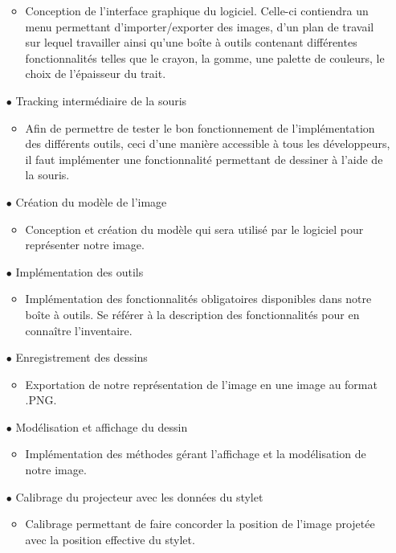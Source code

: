 \documentclass[11pt,a4paper,oldfontcommands]{memoir}
\begin{document}
\begin{itemize}
\begin{itemize}
	\item Conception de l’interface graphique du logiciel. Celle-ci contiendra un menu permettant d’importer/exporter des images, d’un plan de travail sur lequel travailler ainsi qu’une boîte à outils contenant différentes fonctionnalités telles que le crayon, la gomme, une palette de couleurs, le choix de l’épaisseur du trait.
	\end{itemize}
\item[$\bullet$] Tracking intermédiaire de la souris
    \begin{itemize}
	\item Afin de permettre de tester le bon fonctionnement de l’implémentation des différents outils, ceci d’une manière accessible à tous les développeurs, il faut implémenter une fonctionnalité permettant de dessiner à l’aide de la souris.
	\end{itemize}
\item[$\bullet$] Création du modèle de l’image
    \begin{itemize}
	\item Conception et création du modèle qui sera utilisé par le logiciel pour représenter notre image.
	\end{itemize}
\item[$\bullet$] Implémentation des outils
    \begin{itemize}
	\item Implémentation des fonctionnalités obligatoires disponibles dans notre boîte à outils. Se référer à la description des fonctionnalités pour en connaître l'inventaire.
	\end{itemize}
\item[$\bullet$] Enregistrement des dessins
    \begin{itemize}
	\item Exportation de notre représentation de l’image en une image au format .PNG.
	\end{itemize}
\item[$\bullet$] Modélisation et affichage du dessin
    \begin{itemize}
	\item Implémentation des méthodes gérant l’affichage et la modélisation de notre image.
	\end{itemize}
\item[$\bullet$] Calibrage du projecteur avec les données du stylet
    \begin{itemize}
	\item Calibrage permettant de faire concorder la position de l’image projetée avec la position effective du stylet.

\end{itemize}
\end{itemize}
\end{document}
